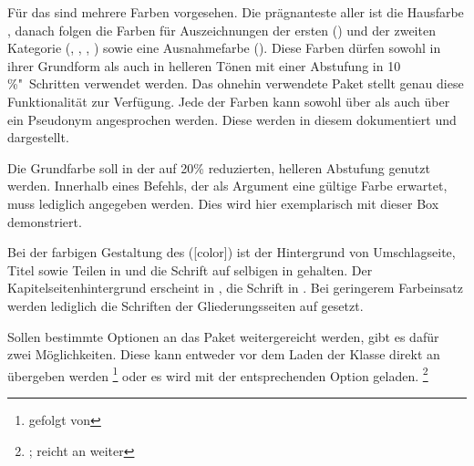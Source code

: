 Für das \CD sind mehrere Farben vorgesehen. Die prägnanteste aller ist die 
Hausfarbe , danach folgen die Farben für Auszeichnungen der ersten
() und der zweiten Kategorie (, , 
, ) sowie eine Ausnahmefarbe (). 
Diese Farben dürfen sowohl in ihrer Grundform als auch in helleren Tönen mit 
einer Abstufung in 10\,\%"~Schritten verwendet werden. Das ohnehin verwendete 
Paket  stellt genau diese Funktionalität zur Verfügung. Jede 
der Farben kann sowohl über  als auch über ein 
Pseudonym  angesprochen werden. Diese werden in diesem 
\autorefname dokumentiert und dargestellt.
%
\begin{Example*}
Die Grundfarbe  soll in der auf 20\% reduzierten, helleren 
Abstufung genutzt werden. Innerhalb eines Befehls, der als Argument eine 
gültige Farbe erwartet, muss lediglich  angegeben 
werden. Dies wird hier exemplarisch mit dieser \colorbox{HKS44!20}{%
  Box %
} demonstriert.
\end{Example*}
%
Bei der farbigen Gestaltung des \CDs ([color]) ist der Hintergrund 
von Umschlagseite, Titel sowie Teilen in  und die Schrift auf 
selbigen in  gehalten. Der Kapitelseitenhintergrund
erscheint in , die Schrift in . Bei 
geringerem Farbeinsatz werden lediglich die Schriften der Gliederungsseiten auf 
 gesetzt.

Sollen bestimmte Optionen an das Paket  weitergereicht werden, 
gibt es dafür zwei Möglichkeiten. Diese kann entweder vor dem Laden der Klasse 
direkt an  übergeben werden%
\footnote{%
   gefolgt von
} oder es wird  mit der entsprechenden Option geladen.%
\footnote{
  ;
   reicht  an  weiter
}
\newcommand*\cdcolorcalc{}
\newcommand*\cdcolorname{}
\newcommand*\cdcolorvalue{}
\newcommand*\cdcolortext{}
\newcommand*\cdcolor[2][0]{%
  \noindent%
  \begin{tikzpicture}[every node/.style={%
    rectangle,minimum height=.1\linewidth,minimum width=25mm%
  }]%
  \def\cdcolorcalc##1##2{%
    \pgfmathparse{100-##1*10}%
    \xdef\cdcolorname{HKS##2!\pgfmathresult}%
    \xdef\cdcolorvalue{\pgfmathresult}%
    \pgfmathparse{10+##1*10}%
  }%
  \foreach \x in {0,1,...,9}{%
    \cdcolorcalc{\x}{#2}%
    \ifnum\x<#1%
      \def\cdcolortext{white}%
    \else%
      \def\cdcolortext{black}%
    \fi%
    \node [fill=\cdcolorname,rotate=90] at (.\x\linewidth,0)%
      {\textcolor{\cdcolortext}{HKS#2!\pgfmathprintnumber\cdcolorvalue}};%
  };%
  \end{tikzpicture}%
}


